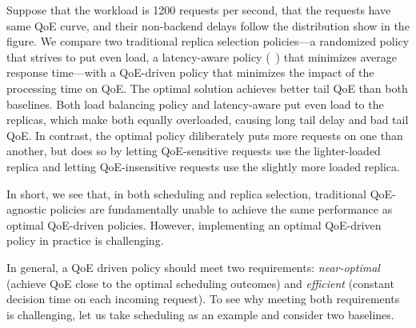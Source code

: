 Suppose that the workload is 1200 requests per second, that the requests have same QoE curve, and their non-backend delays follow the distribution show in the figure.
We compare two traditional replica selection policies---a randomized policy that strives to put even load, a latency-aware policy (\eg~\cite{suresh2015c3,wu2015costlo}) that minimizes average response time---with a QoE-driven policy that minimizes the impact of the processing time on QoE.
The optimal solution achieves better tail QoE than both baselines. 
Both load balancing policy and latency-aware put even load to the replicas, which make both equally overloaded, causing long tail delay and bad tail QoE.
In contrast, the optimal policy diliberately puts more requests on one than another, but does so by letting QoE-sensitive requests use the lighter-loaded replica and letting QoE-insensitive requests use the slightly more loaded replica. 

In short, we see that, in both scheduling and replica selection, traditional QoE-agnostic policies are fundamentally unable to achieve the same performance as optimal QoE-driven policies. However, implementing an optimal  QoE-driven policy in practice is challenging.




In general, a QoE driven policy should meet two requirements: {\em near-optimal} (\ie achieve QoE close to the optimal scheduling outcomes) and {\em efficient} (\ie constant decision time on each incoming request).
To see why meeting both requirements is challenging, let us take scheduling as an example and consider two baselines.

